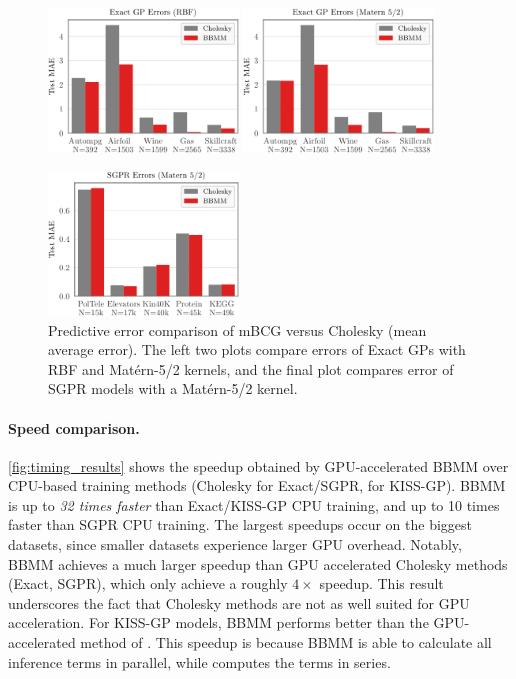 \begin{figure}[t]
  \centering
  \includegraphics[width=0.45\textwidth]{figures/bbmm_error_exact_gp_RBF.pdf}
  \quad
  \includegraphics[width=0.45\textwidth]{figures/bbmm_error_exact_gp_Matern.pdf}
  \vspace{1em}

  \includegraphics[width=0.45\textwidth]{figures/bbmm_error_sgpr_Matern.pdf}
  \caption[Predictive error comparison of mBCG versus Cholesky.]{
		Predictive error comparison of mBCG versus Cholesky (mean average error).
		The left two plots compare errors of Exact GPs with RBF and Mat\'ern-5/2 kernels,
		and the final plot compares error of SGPR models with a Mat\'ern-5/2 kernel.
	}
  \label{fig:bbmm_error_results}
\end{figure}

\paragraph{Speed comparison.}
\cref{fig:timing_results} shows the speedup obtained by GPU-accelerated BBMM over CPU-based training methods (Cholesky for Exact/SGPR, \citet{dong2017scalable} for KISS-GP).
BBMM is up to \emph{32 times faster} than Exact/KISS-GP CPU training, and up to 10 times faster than SGPR CPU training.
The largest speedups occur on the biggest datasets, since smaller datasets experience larger GPU overhead.
Notably, BBMM achieves a much larger speedup than GPU accelerated Cholesky methods (Exact, SGPR), which only achieve a roughly $4\times$ speedup.
This result underscores the fact that Cholesky methods are not as well suited for GPU acceleration.
For KISS-GP models, BBMM performs better than the GPU-accelerated method of \citet{dong2017scalable}.
This speedup is because BBMM is able to calculate all inference terms in parallel, while \citet{dong2017scalable} computes the terms in series.

